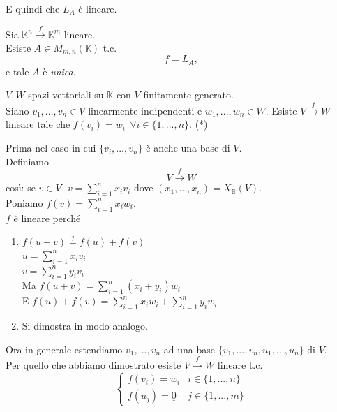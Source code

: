 E quindi che $L_A$ è lineare.
\begin{proposizione}
    Sia $\mathbb{K}^n\xrightarrow{f}\mathbb{K}^m$ lineare. \\
    Esiste $A\in M _{m,n}(\mathbb{K})$ t.c.
    \begin{equation}
        f=L_A,
    \end{equation}
    e tale $A$ è \textit{unica}.
\end{proposizione}
\begin{proposizione}[]
    $V,W$ spazi vettoriali su $\mathbb{K}$ con $V$ finitamente generato. \\
    Siano $v_1,...,v_n\in V$ linearmente indipendenti e $w_1,...,w_n\in W$.
    Esiste $V\xrightarrow {f} W$ lineare tale che $f(v_i)=w_i\ \ \forall i\in\{1,...,n\}$. (*)
\end{proposizione}
\begin{dimostrazione}[]
    Prima nel caso in cui $\{v_i,...,v_n\}$ è anche una base di $V$. \\
    Definiamo
    \begin{equation}
        V\xrightarrow{f} W
    \end{equation}
    così: se $v\in V\ \ \ v=\sum_{i=1}^{n}x_iv_i$ dove $(x_1,...,x_n)=X_ \mathbb{B}(V)$. \\
    Poniamo $f(v)=\sum_{i=1}^{n}x_iw_i$. \\
    $f$ è lineare perché
    \begin{enumerate}
        \item $f(u+v)\overset{?}{=}f(u)+f(v)$ \\
        $u=\sum_{i=1}^{n}x_iv_i$ \\
        $v=\sum_{i=1}^{n}y_iv_i$ \\
        Ma $f(u+v)=\sum_{i=1}^{n}(x_i+y_i)w_i$ \\
        E $f(u)+f(v)=\sum_{i=1}^{n}x_iw_i+\sum_{i=1}^{n}y_iw_i$
        \item Si dimostra in modo analogo.
    \end{enumerate}
    Ora in generale estendiamo $v_1,...,v_n$ ad una base $\{v_1,...,v_n,u_1,...,u_n\}$ di $V$. \\
    Per quello che abbiamo dimostrato esiste $V\xrightarrow{f} W$ lineare t.c.
    \begin{equation}
        \begin{cases}
            f(v_i)=w_i & i\in\{1,...,n\}\\
            f(u_j)=\underline{0} & j\in\{1,...,m\}
        \end{cases}
    \end{equation}
\end{dimostrazione}
